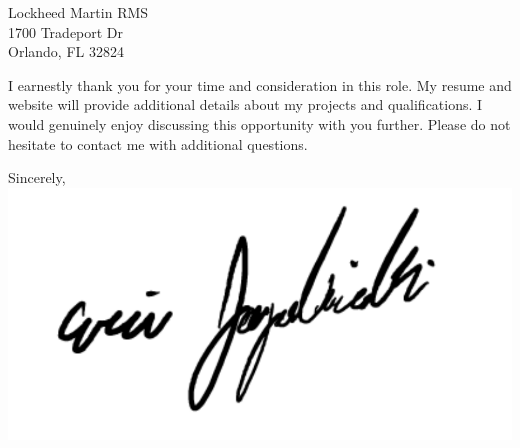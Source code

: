 \documentclass[11pt]{letter} %
\begin{document}
\begin{letter}{Lockheed Martin RMS\\
1700 Tradeport Dr \\
Orlando, FL 32824
}

I earnestly thank you for your time and consideration in this role. My resume and website will provide additional details about my projects and qualifications. I would genuinely enjoy discussing this opportunity with you further. Please do not hesitate to contact me with additional questions.

Sincerely, \\
\includegraphics[width=0.3\linewidth]{signature.pdf}

 



\end{letter}
\end{document}
